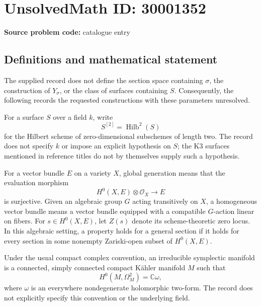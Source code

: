 \documentclass[11pt]{article}
\newcommand{\C}{\mathbb{C}}
\begin{document}
\section*{UnsolvedMath ID: 30001352}
\textbf{Source problem code:} catalogue entry
\subsection{Definitions and mathematical statement}
The supplied record does not define the section space containing \(\sigma\), the construction of \(Y_\sigma\), or the class of surfaces containing \(S\). Consequently, the following records the requested constructions with these parameters unresolved.

For a surface \(S\) over a field \(k\), write
\[
S^{[2]}=\operatorname{Hilb}^{2}(S)
\]
for the Hilbert scheme of zero-dimensional subschemes of length two. The record does not specify \(k\) or impose an explicit hypothesis on \(S\); the K3 surfaces mentioned in reference titles do not by themselves supply such a hypothesis.

For a vector bundle \(E\) on a variety \(X\), global generation means that the evaluation morphism
\[
H^0(X,E)\otimes\mathcal O_X\longrightarrow E
\]
is surjective. Given an algebraic group \(G\) acting transitively on \(X\), a homogeneous vector bundle means a vector bundle equipped with a compatible \(G\)-action linear on fibers. For \(s\in H^0(X,E)\), let \(Z(s)\) denote its scheme-theoretic zero locus. In this algebraic setting, a property holds for a general section if it holds for every section in some nonempty Zariski-open subset of \(H^0(X,E)\).

Under the usual compact complex convention, an irreducible symplectic manifold is a connected, simply connected compact K\"ahler manifold \(M\) such that
\[
H^0(M,\Omega_M^2)=\C\omega,
\]
where \(\omega\) is an everywhere nondegenerate holomorphic two-form. The record does not explicitly specify this convention or the underlying field.
\end{document}
